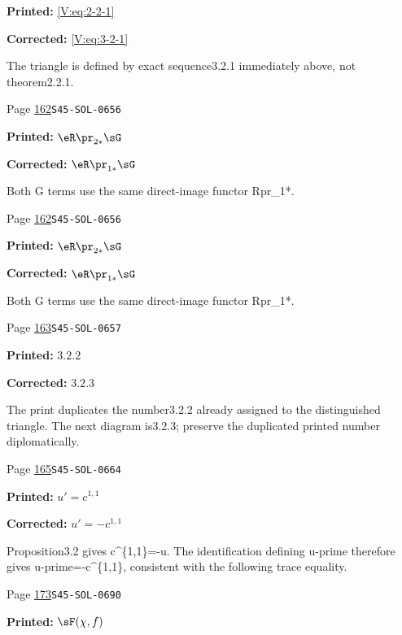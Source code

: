 \begin{description}
\par\noindent\textbf{Printed:} \eqref{V:eq:2-2-1}
\par\noindent\textbf{Corrected:} \eqref{V:eq:3-2-1}
\par\noindent The triangle is defined by exact sequence3.2.1 immediately above, not theorem2.2.1.
\smallskip
\item[\hypertarget{apparatus:EN-0094}{94}] Page \hyperlink{printpage:en:162}{162}\quad\texttt{S45-SOL-0656}
\par\noindent\textbf{Printed:} \(\eR \pr_{2\ast}\sG\)
\par\noindent\textbf{Corrected:} \(\eR \pr_{1\ast}\sG\)
\par\noindent Both G terms use the same direct-image functor Rpr\_1*.
\smallskip
\item[\hypertarget{apparatus:EN-0095}{95}] Page \hyperlink{printpage:en:162}{162}\quad\texttt{S45-SOL-0656}
\par\noindent\textbf{Printed:} \(\eR \pr_{2\ast}\sG\)
\par\noindent\textbf{Corrected:} \(\eR \pr_{1\ast}\sG\)
\par\noindent Both G terms use the same direct-image functor Rpr\_1*.
\smallskip
\item[\hypertarget{apparatus:EN-0096}{96}] Page \hyperlink{printpage:en:163}{163}\quad\texttt{S45-SOL-0657}
\par\noindent\textbf{Printed:} \(3.2.2\)
\par\noindent\textbf{Corrected:} \(3.2.3\)
\par\noindent The print duplicates the number3.2.2 already assigned to the distinguished triangle. The next diagram is3.2.3; preserve the duplicated printed number diplomatically.
\smallskip
\item[\hypertarget{apparatus:EN-0097}{97}] Page \hyperlink{printpage:en:165}{165}\quad\texttt{S45-SOL-0664}
\par\noindent\textbf{Printed:} \(u'=c^{1,1}\)
\par\noindent\textbf{Corrected:} \(u'=-c^{1,1}\)
\par\noindent Proposition3.2 gives c\textasciicircum{}\{1,1\}=-u. The identification defining u-prime therefore gives u-prime=-c\textasciicircum{}\{1,1\}, consistent with the following trace equality.
\smallskip
\item[\hypertarget{apparatus:EN-0098}{98}] Page \hyperlink{printpage:en:173}{173}\quad\texttt{S45-SOL-0690}
\par\noindent\textbf{Printed:} \(\sF(\chi,f)\)

\end{description}
